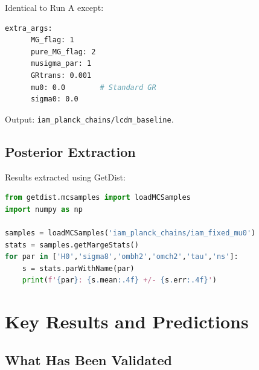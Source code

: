 \documentclass[11pt,letterpaper]{article}
\begin{document}
Identical to Run A except:
\begin{lstlisting}[language=bash]
    extra_args:
      MG_flag: 1
      pure_MG_flag: 2
      musigma_par: 1
      GRtrans: 0.001
      mu0: 0.0        # Standard GR
      sigma0: 0.0
\end{lstlisting}
Output: \texttt{iam\_planck\_chains/lcdm\_baseline}.

\subsection{Posterior Extraction}

Results extracted using GetDist:
\begin{lstlisting}[language=Python]
from getdist.mcsamples import loadMCSamples
import numpy as np

samples = loadMCSamples('iam_planck_chains/iam_fixed_mu0')
stats = samples.getMargeStats()
for par in ['H0','sigma8','ombh2','omch2','tau','ns']:
    s = stats.parWithName(par)
    print(f'{par}: {s.mean:.4f} +/- {s.err:.4f}')
\end{lstlisting}

\section{Key Results and Predictions}

\subsection{What Has Been Validated}
\end{document}
